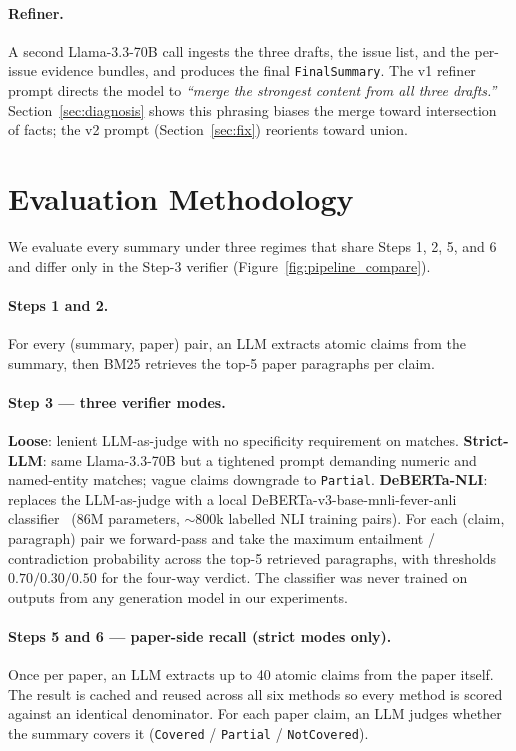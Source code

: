 \documentclass[11pt,a4paper]{article}
\begin{document}
\paragraph{Refiner.}
A second Llama-3.3-70B call ingests the three drafts, the issue list, and
the per-issue evidence bundles, and produces the final
\texttt{FinalSummary}. The v1 refiner prompt directs the model to
\textit{``merge the strongest content from all three drafts.''}
Section~\ref{sec:diagnosis} shows this phrasing biases the merge toward
intersection of facts; the v2 prompt
(Section~\ref{sec:fix}) reorients toward union.

\section{Evaluation Methodology}
\label{sec:eval}

We evaluate every summary under three regimes that share Steps 1,
2, 5, and 6 and differ only in the Step-3 verifier
(Figure~\ref{fig:pipeline_compare}).

\paragraph{Steps 1 and 2.}
For every (summary, paper) pair, an LLM extracts atomic claims from the
summary, then BM25 retrieves the top-5 paper paragraphs per claim.

\paragraph{Step 3 — three verifier modes.}
\textbf{Loose}: lenient LLM-as-judge with no specificity requirement on
matches. \textbf{Strict-LLM}: same Llama-3.3-70B but a tightened prompt
demanding numeric and named-entity matches; vague claims downgrade to
\texttt{Partial}. \textbf{DeBERTa-NLI}: replaces the LLM-as-judge with a
local DeBERTa-v3-base-mnli-fever-anli
classifier~\cite{he2021debertav3} (86M parameters, $\sim$800k labelled
NLI training pairs). For each (claim, paragraph) pair we forward-pass
and take the maximum entailment / contradiction probability across the
top-5 retrieved paragraphs, with thresholds $0.70/0.30/0.50$ for the
four-way verdict. The classifier was never trained on outputs from any
generation model in our experiments.

\paragraph{Steps 5 and 6 — paper-side recall (strict modes only).}
Once per paper, an LLM extracts up to 40 atomic claims from the paper
itself. The result is cached and reused across all six methods so
every method is scored against an identical denominator. For each paper
claim, an LLM judges whether the summary covers it
(\texttt{Covered} / \texttt{Partial} / \texttt{NotCovered}).
\end{document}
